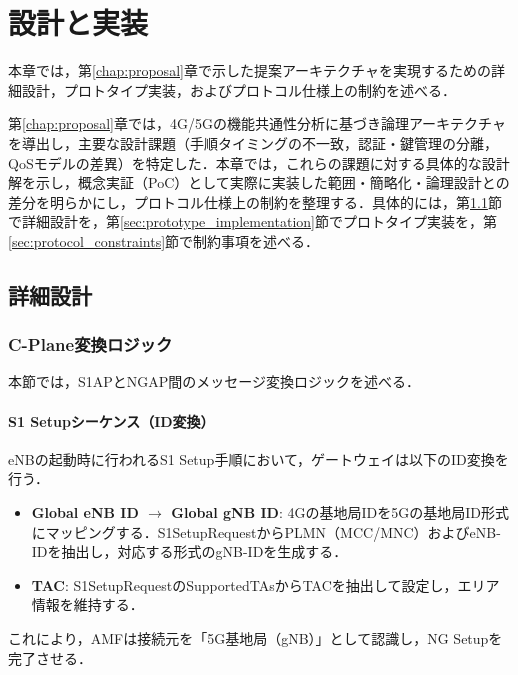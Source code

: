 \chapter{設計と実装}
\label{chap:design}

本章では，第\ref{chap:proposal}章で示した提案アーキテクチャを実現するための詳細設計，プロトタイプ実装，およびプロトコル仕様上の制約を述べる．

第\ref{chap:proposal}章では，4G/5Gの機能共通性分析に基づき論理アーキテクチャを導出し，主要な設計課題（手順タイミングの不一致，認証・鍵管理の分離，QoSモデルの差異）を特定した．本章では，これらの課題に対する具体的な設計解を示し，概念実証（PoC）として実際に実装した範囲・簡略化・論理設計との差分を明らかにし，プロトコル仕様上の制約を整理する．具体的には，第\ref{sec:detailed_design}節で詳細設計を，第\ref{sec:prototype_implementation}節でプロトタイプ実装を，第\ref{sec:protocol_constraints}節で制約事項を述べる．

\section{詳細設計}
\label{sec:detailed_design}

\subsection{C-Plane変換ロジック}
本節では，S1AP\cite{3GPP_TS36413}とNGAP\cite{3GPP_TS38413}間のメッセージ変換ロジックを述べる．

\subsubsection{S1 Setupシーケンス（ID変換）}
eNBの起動時に行われるS1 Setup手順において，ゲートウェイは以下のID変換を行う．
\begin{itemize}
  \item \textbf{Global eNB ID $\rightarrow$ Global gNB ID}: 4Gの基地局IDを5Gの基地局ID形式にマッピングする．S1SetupRequestからPLMN（MCC/MNC）およびeNB-IDを抽出し，対応する形式のgNB-IDを生成する．
  \item \textbf{TAC}: S1SetupRequestのSupportedTAsからTACを抽出して設定し，エリア情報を維持する．
\end{itemize}
これにより，AMFは接続元を「5G基地局（gNB）」として認識し，NG Setupを完了させる．

